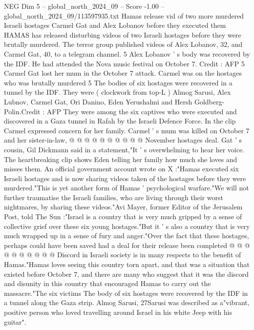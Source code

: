 \begin{textsample}{NEG Dim 5 – global\_north\_2024\_09 – Score -1.00 – global\_north\_2024\_09/113597935.txt}  \label{ex:f5_neg_146}
Hamas release vid of two more murdered Israeli hostages Carmel Gat and Alex Lobanov before they executed them HAMAS has released disturbing videos of two Israeli hostages before they were brutally murdered.
The terror group published videos of Alex Lobanov, 32, and Carmel Gat, 40, to a telegram channel. 5 Alex Lobanov ' s body was recovered by the IDF.
He had attended the Nova music festival on October 7.
Credit : AFP 5 Carmel Gat lost her mum in the October 7 attack.
Carmel was on the hostages who was brutally murdered 5 The bodies of six hostages were recovered in a tunnel by the IDF.
They were ( clockwork from top-L ) Almog Sarusi, Alex Lubnov, Carmel Gat, Ori Danino, Eden Yerushalmi and Hersh Goldberg-Polin.Credit : AFP They were among the six captives who were executed and discovered in a Gaza tunnel in Rafah by the Israeli Defence Force.
In the clip Carmel expressed concern for her family.
Carmel ' s mum was killed on October 7 and her sister-in-law, @ @ @ @ @ @ @ @ @ @ November hostages deal.
Gat ' s cousin, Gil Dickmann said in a statement,"It ' s overwhelming to hear her voice.
The heartbreaking clip shows Eden telling her family how much she loves and misses them.
An official government account wrote on X :"Hamas executed six Israeli hostages and is now sharing videos taken of the hostages before they were murdered."This is yet another form of Hamas ' psychological warfare."We will not further traumatise the Israeli families, who are living through their worst nightmares, by sharing these videos."Avi Mayer, former Editor of the Jerusalem Post, told The Sun :"Israel is a country that is very much gripped by a sense of collective grief over these six young hostages."But it ' s also a country that is very much wrapped up in a sense of fury and anger."Over the fact that these hostages, perhaps could have been saved had a deal for their release been completed @ @ @ @ @ @ @ @ @ @ Discord in Israeli society is in many respects to the benefit of Hamas."Hamas loves seeing this country torn apart, and that was a situation that existed before October 7, and there are many who suggest that it was the discord and disunity in this country that encouraged Hamas to carry out the massacre."The six victims The body of six hostages were recovered by the IDF in a tunnel along the Gaza strip.
Almog Sarusi, 27Sarusi was described as a"vibrant, positive person who loved travelling around Israel in his white Jeep with his guitar".

\end{textsample}

